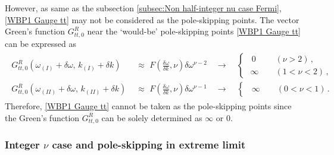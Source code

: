 \documentclass[11pt,a4paper]{article}
\newcommand{\ra}{\rightarrow}
\begin{document}
However, as same as the subsection \ref{subsec:Non half-integer nu case Fermi}, \eqref{WBP1 Gauge tt} may not be considered as the pole-skipping points. The vector Green's function $G^R_{tt,0}$ near the `would-be' pole-skipping points \eqref{WBP1 Gauge tt} can be expressed as
\begin{align}\label{CHECKINGPSW Gauge tt}
\begin{split}
G^R_{tt,0}(\omega_{(I)} + \delta \omega,\, k_{(I)} + \delta k)  &\,\,\approx\,\, F\left(\frac{\delta \omega}{\delta k}, \nu\right) \delta \omega^{\nu-2} \quad\rightarrow\quad
\begin{cases}
       \,\,\, 0 \qquad\,\, \left( \nu>2 \right) \,,\\
       \,\, \infty \qquad \left(1<\nu<2\right) \,, 
\end{cases}
\\
G^R_{tt,0}(\omega_{(II)} + \delta \omega,\, k_{(II)} + \delta k)  &\,\,\approx\,\, F\left(\frac{\delta \omega}{\delta k}, \nu\right) \delta \omega^{\nu-1} \quad\rightarrow\quad
\begin{cases}
       \,\,\, \infty \qquad \left(0<\nu<1\right) \,.
\end{cases}
\end{split} 
\end{align}
Therefore, \eqref{WBP1 Gauge tt} cannot be taken as the pole-skipping points since the Green's function $G^R_{tt,0}$ can be solely determined as $\infty$ or $0$.




\subsubsection{Integer $\nu$ case and pole-skipping in extreme limit} \label{sec:4.3.2}
\end{document}
